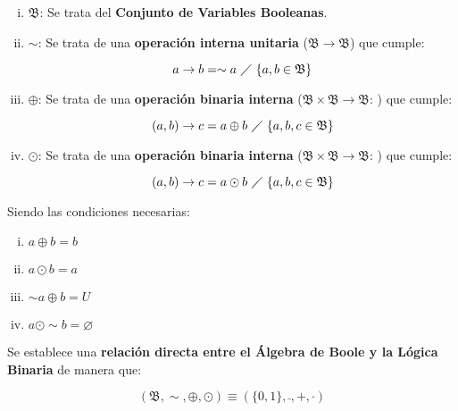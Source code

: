 \begin{enumerate}[i.]

\item $\mathfrak{B}$: Se trata del \textbf{Conjunto de Variables Booleanas}.
 
\item $\sim$: Se trata de una \textbf{operación interna unitaria} 
($\mathfrak{B} 
\rightarrow \mathfrak{B}$) que cumple:

\begin{equation}
a \rightarrow b = \sim a\ \diagup\ \{a,b \in \mathfrak{B}\}
\end{equation}

\item $\oplus$: Se trata de una \textbf{operación binaria interna} 
($\mathfrak{B} \times \mathfrak{B} \rightarrow \mathfrak{B}$: ) que cumple:

\begin{equation}
(a,b) \rightarrow c = a \oplus b\ \diagup\ \{a,b,c \in \mathfrak{B}\}
\end{equation}

\item $\odot$: Se trata de una \textbf{operación binaria interna} 
($\mathfrak{B} 
\times \mathfrak{B} \rightarrow \mathfrak{B}$: ) que cumple:

\begin{equation}
(a,b) \rightarrow c = a \odot b\ \diagup\ \{a,b,c \in \mathfrak{B}\}
\end{equation}

\end{enumerate}

Siendo las condiciones necesarias:

\begin{enumerate}[i.]

\item $a \oplus b = b$
 
\item $a \odot b = a$

\item $\sim a \oplus b = U$

\item $a \odot \sim b = \varnothing$

\end{enumerate}

 Se establece una \textbf{relación directa entre el Álgebra de Boole y la 
Lógica Binaria} de manera que:

\begin{equation}
(\mathfrak{B}, \sim, \oplus, \odot) \equiv (\{0,1\}, \bar{ }, +, \cdot)
\end{equation}

